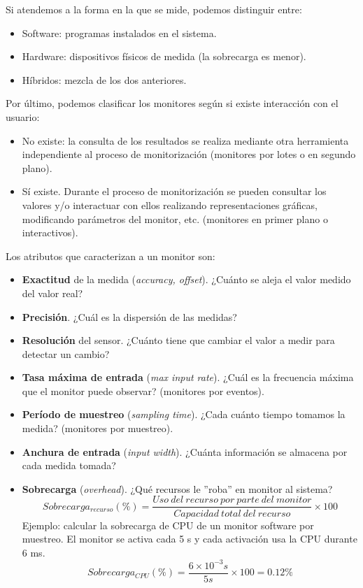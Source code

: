 \documentclass[12pt,spanish]{article}
\begin{document}
Si atendemos a la forma en la que se mide, podemos distinguir entre:
\begin{itemize}
	\item Software: programas instalados en el sistema.
	\item Hardware: dispositivos físicos de medida (la sobrecarga es menor).
	\item Híbridos: mezcla de los dos anteriores.
\end{itemize}

Por último, podemos clasificar los monitores según si existe interacción con el usuario:

\begin{itemize}
	\item No existe: la consulta de los resultados se realiza mediante otra herramienta independiente al proceso de monitorización (monitores por lotes o en segundo plano).
	\item Sí existe. Durante el proceso de monitorización se pueden consultar los valores y/o interactuar con ellos realizando representaciones gráficas, modificando parámetros del monitor, etc. (monitores en primer plano o interactivos).
\end{itemize}

Los atributos que caracterizan a un monitor son:

\begin{itemize}
	\item \textbf{Exactitud} de la medida (\textit{accuracy, offset}). ¿Cuánto se aleja el valor medido del valor real?
	\item \textbf{Precisión}. ¿Cuál es la dispersión de las medidas?
	\item \textbf{Resolución} del sensor. ¿Cuánto tiene que cambiar el valor a medir para detectar un cambio?
	\item \textbf{Tasa máxima de entrada} (\textit{max input rate}). ¿Cuál es la frecuencia máxima que el monitor puede observar? (monitores por eventos).
	\item \textbf{Período de muestreo} (\textit{sampling time}). ¿Cada cuánto tiempo tomamos la medida? (monitores por muestreo).
	\item \textbf{Anchura de entrada} (\textit{input width}). ¿Cuánta información se almacena por cada medida tomada?
	\item \textbf{Sobrecarga} (\textit{overhead}). ¿Qué recursos le ''roba'' en monitor al sistema?
	\[
		Sobrecarga_{recurso}(\%) = \frac{Uso\ del\ recurso\ por\ parte\ del\ monitor}{Capacidad\ total\ del\ recurso} \times 100
	\]
	Ejemplo: calcular la sobrecarga de CPU de un monitor software por muestreo. El monitor se activa cada 5 s y cada activación usa la CPU durante 6 ms.
	\[
		Sobrecarga_{CPU}(\%) = \frac{6 \times 10^{-3} s}{5 s} \times 100 = 0.12\%
	\]
\end{itemize}
\end{document}

